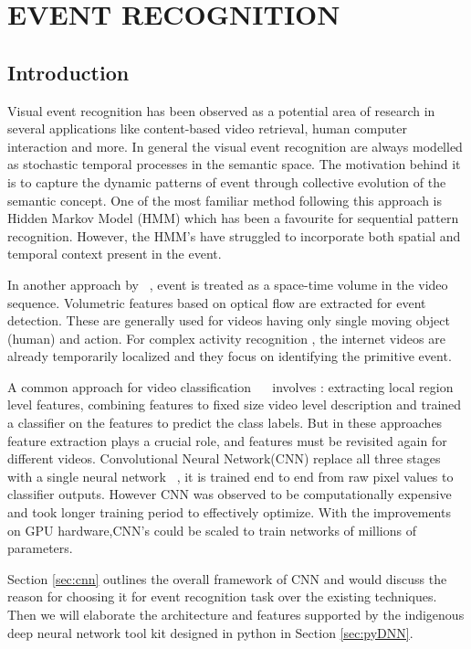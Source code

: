 \chapter{EVENT RECOGNITION}
 \label{chap:eventrec}
 \section{Introduction}
Visual event recognition has been observed as a potential area of research in several applications like  content-based video retrieval, human computer interaction and more.  In general the visual event recognition are always modelled as stochastic temporal processes in the semantic space.  The motivation behind it is to capture the dynamic patterns of event through collective evolution of the semantic concept.  One of the most familiar method following this approach is Hidden Markov Model (HMM) which has been a favourite for 	sequential pattern recognition.  However, the HMM's have struggled to incorporate both spatial and temporal context present in the event.  
\par In another approach by ~\cite{YanKe05}, event is treated as a space-time volume in the video sequence.  Volumetric features based on optical flow are extracted for event detection.  These are generally used for videos having only single moving object (human) and action.  For complex activity recognition \citep{YanKe07}, the internet videos are already temporarily localized and they focus on identifying the primitive event.
\par A common approach for video classification ~\citep{Liu09}~\citep{Niebles10} involves : extracting local region level features, combining features to fixed size video level description and trained a classifier on the features to predict the class labels.  But in these approaches feature extraction plays a crucial role, and features must be revisited again for different videos.  Convolutional Neural Network(CNN) replace all three stages with a single neural network ~\cite{Ji13}, it is trained end to end from raw pixel values to classifier outputs.  However CNN was observed to be computationally expensive and took longer training period to effectively optimize.  With the improvements on GPU hardware,CNN's could be scaled to train networks of millions of parameters.

\par Section \ref{sec:cnn} outlines the overall framework of CNN and would discuss the reason for choosing it for event recognition task over the existing techniques.  Then we will elaborate the architecture and features supported by the indigenous deep neural network tool kit designed in python in Section \ref{sec:pyDNN}. 

